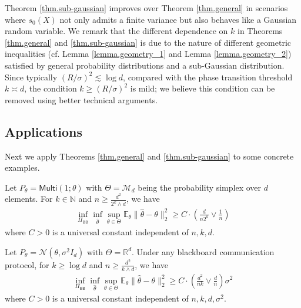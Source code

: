 \documentclass[final,12pt]{colt2018} %
\def \bE {\mathbb{E}}
\def \bR {\mathbb{R}}
\newcommand{\calM}{{\mathcal{M}}}
\newcommand{\calN}{{\mathcal{N}}}
\begin{document}
Theorem \ref{thm.sub-gaussian} improves over Theorem \ref{thm.general} in scenarios where $s_{0}(X)$ not only admits a finite variance but also behaves like a Gaussian random variable. We remark that the different dependence on $k$ in Theorems \ref{thm.general} and \ref{thm.sub-gaussian} is due to the nature of different geometric inequalities (cf. Lemma \ref{lemma.geometry_1} and Lemma \ref{lemma.geometry_2}) satisfied by general probability distributions and a sub-Gaussian distribution. Since typically $(R/\sigma)^2\lesssim \log d$, compared with the phase transition threshold $k\asymp d$, the condition $k\ge (R/\sigma)^2$ is mild; we believe this condition can be removed using better technical arguments.

\subsection{Applications}
Next we apply Theorems \ref{thm.general} and \ref{thm.sub-gaussian} to some concrete examples.

\begin{corollary}\label{cor.multi}
	Let $P_\theta=\mathsf{Multi}(1;\theta)$ with $\Theta=\calM_d$ being the probability simplex over $d$ elements. For $k\in \mathbb{N}$ and $n\ge \frac{d^2}{2^k\wedge d}$, we have
	\begin{align*}
	\inf_{\Pi_{\mathsf{BB}}} \inf_{\hat{\theta}}\sup_{\theta\in\Theta} \bE_{\theta}\|\hat{\theta}-\theta\|_2^2 \ge C\cdot \left(\frac{d}{n2^k} \vee \frac{1}{n}\right)
	\end{align*}
	where $C>0$ is a universal constant independent of $n,k,d$.
\end{corollary}

\begin{corollary}\label{cor.gaussian}
	Let $P_\theta=\calN(\theta,\sigma^2I_d)$ with $\Theta=\bR^d$. Under any blackboard communication protocol, for $k\ge \log d$ and $n\ge \frac{d^2}{k\wedge d}$, we have
	\begin{align*}
	\inf_{\Pi_{\mathsf{BB}}} \inf_{\hat{\theta}}\sup_{\theta\in\Theta} \bE_{\theta}\|\hat{\theta}-\theta\|_2^2 \ge C\cdot \left(\frac{d^2}{nk} \vee \frac{d}{n}\right)\sigma^2
	\end{align*}
	where $C>0$ is a universal constant independent of $n,k,d,\sigma^2$.
\end{corollary}
\end{document}
